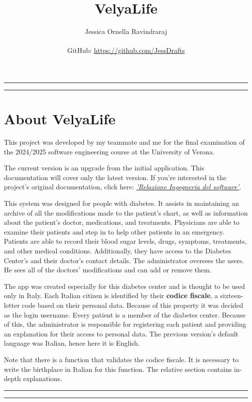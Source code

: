 \documentclass[10pt, titlepage]{article}
\title{VelyaLife}
\author{Jessica Ornella Ravindraraj \\ \\
GitHub: \url{https://github.com/JessDrafts}}
\date{}
\begin{document}
    \maketitle
    \newpage
    \hrule
    \vspace{1mm}
    \hrule
    \section*{About VelyaLife}
    This project was developed by my teammate and me for the final examination of the 2024/2025 software engineering course at the University of Verona. 

    The current version is an upgrade from the initial application. This documentation will cover only the latest version. If you're interested in the project's original documentation, click here: \href{https://github.com/JessDrafts/VelyaLife_diabetesLogger/blob/8e41f58e0bbccc49eea5d41ba4e14d7d9b7a9045/documentation/RELAZIONE%20INGEGNERIA%20DEL%20SOFTWARE_V1.pdf}{\textit{’Relazione Ingegneria del software’}}.
    
    This system was designed for people with diabetes. It assists in maintaining an archive of all the modifications made to the patient's chart, as well as information about the patient's doctor, medications, and treatments. Physicians are able to examine their patients and step in to help other patients in an emergency. Patients are able to record their blood sugar levels, drugs, symptoms, treatments, and other medical conditions. Additionally, they have access to the Diabetes Center's and their doctor's contact details. The administrator oversees the users. He sees all of the doctors' modifications and can add or remove them.
    
    The app was created especially for this diabetes center and is thought to be used only in Italy. Each Italian citizen is identified by their \textbf{codice fiscale}, a sixteen-letter code based on their personal data. Because of this property it was decided as the login username. Every patient is a member of the diabetes center. Because of this, the administrator is responsible for registering each patient and providing an explanation for their access to personal data. The previous version's default language was Italian, hence here it is English.

    Note that there is a function that validates the codice fiscale. It is necessary to write the birthplace in Italian for this function. The relative section contains in-depth explanations.
    \vspace{3mm}
    \hrule
    \vspace{1mm}
    \hrule
    
\end{document}

